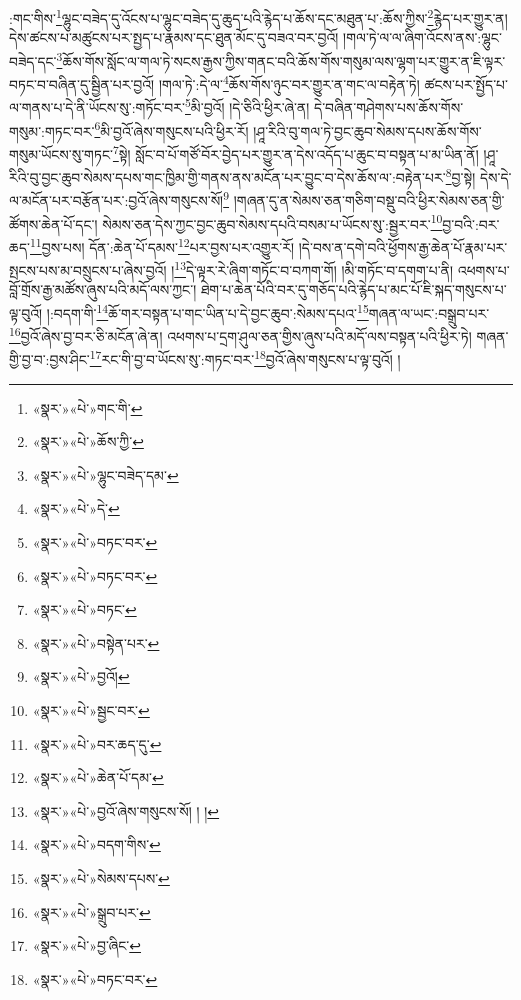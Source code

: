 :གང་གིས་\footnote{«སྣར་»«པེ་»གང་གི་}ལྷུང་བཟེད་དུ་འོངས་པ་ལྷུང་བཟེད་དུ་ཆུད་པའི་རྙེད་པ་ཆོས་དང་མཐུན་པ་:ཆོས་ཀྱིས་\footnote{«སྣར་»«པེ་»ཆོས་ཀྱི་}རྙེད་པར་གྱུར་ན། དེས་ཚངས་པ་མཚུངས་པར་སྤྱད་པ་རྣམས་དང་ཐུན་མོང་དུ་བཟའ་བར་བྱའོ། །གལ་ཏེ་ལ་ལ་ཞིག་འོངས་ནས་:ལྷུང་བཟེད་དང་\footnote{«སྣར་»«པེ་»ལྷུང་བཟེད་དམ་}ཆོས་གོས་སློང་ལ་གལ་ཏེ་སངས་རྒྱས་ཀྱིས་གནང་བའི་ཆོས་གོས་གསུམ་ལས་ལྷག་པར་གྱུར་ན་ཇི་ལྟར་བཏང་བ་བཞིན་དུ་སྦྱིན་པར་བྱའོ། །གལ་ཏེ་:དེ་ལ་\footnote{«སྣར་»«པེ་»དེ་}ཆོས་གོས་ཉུང་བར་གྱུར་ན་གང་ལ་བརྟེན་ཏེ། ཚངས་པར་སྤྱོད་པ་ལ་གནས་པ་དེ་ནི་ཡོངས་སུ་:གཏོང་བར་\footnote{«སྣར་»«པེ་»བཏང་བར་}མི་བྱའོ། །དེ་ཅིའི་ཕྱིར་ཞེ་ན། དེ་བཞིན་གཤེགས་པས་ཆོས་གོས་གསུམ་:གཏང་བར་\footnote{«སྣར་»«པེ་»བཏང་བར་}མི་བྱའོ་ཞེས་གསུངས་པའི་ཕྱིར་རོ། །ཤཱ་རིའི་བུ་གལ་ཏེ་བྱང་ཆུབ་སེམས་དཔས་ཆོས་གོས་གསུམ་ཡོངས་སུ་གཏང་\footnote{«སྣར་»«པེ་»བཏང་}སྟེ། སློང་བ་པོ་གཙོ་བོར་བྱེད་པར་གྱུར་ན་དེས་འདོད་པ་ཆུང་བ་བསྟན་པ་མ་ཡིན་ནོ། །ཤཱ་རིའི་བུ་བྱང་ཆུབ་སེམས་དཔས་གང་ཁྱིམ་གྱི་གནས་ནས་མངོན་པར་བྱུང་བ་དེས་ཆོས་ལ་:བརྟེན་པར་\footnote{«སྣར་»«པེ་»བསྟེན་པར་}བྱ་སྟེ། དེས་དེ་ལ་མངོན་པར་བརྩོན་པར་:བྱའོ་ཞེས་གསུངས་སོ།\footnote{«སྣར་»«པེ་»བྱའོ།} །གཞན་དུ་ན་སེམས་ཅན་གཅིག་བསྡུ་བའི་ཕྱིར་སེམས་ཅན་གྱི་ཚོགས་ཆེན་པོ་དང་། སེམས་ཅན་དེས་ཀྱང་བྱང་ཆུབ་སེམས་དཔའི་བསམ་པ་ཡོངས་སུ་:སྦྱར་བར་\footnote{«སྣར་»«པེ་»སྦྱང་བར་}བྱ་བའི་:བར་ཆད་\footnote{«སྣར་»«པེ་»བར་ཆད་དུ་}བྱས་པས། དོན་:ཆེན་པོ་དམས་\footnote{«སྣར་»«པེ་»ཆེན་པོ་དམ་}པར་བྱས་པར་འགྱུར་རོ། །དེ་བས་ན་དགེ་བའི་ཕྱོགས་རྒྱ་ཆེན་པོ་རྣམ་པར་སྤངས་པས་མ་བསྲུངས་པ་ཞེས་བྱའོ། །\footnote{«སྣར་»«པེ་»བྱའོ་ཞེས་གསུངས་སོ། ། །}དེ་ལྟར་རེ་ཞིག་གཏོང་བ་བཀག་གོ། །མི་གཏོང་བ་དགག་པ་ནི། འཕགས་པ་བློ་གྲོས་རྒྱ་མཚོས་ཞུས་པའི་མདོ་ལས་ཀྱང་། ཐེག་པ་ཆེན་པོའི་བར་དུ་གཅོད་པའི་རྙེད་པ་མང་པོ་ཇི་སྐད་གསུངས་པ་ལྟ་བུའོ། །:བདག་གི་\footnote{«སྣར་»«པེ་»བདག་གིས་}ཆོ་གར་བསྟན་པ་གང་ཡིན་པ་དེ་བྱང་ཆུབ་:སེམས་དཔའ་\footnote{«སྣར་»«པེ་»སེམས་དཔས་}གཞན་ལ་ཡང་:བསྒྲུབ་པར་\footnote{«སྣར་»«པེ་»སྒྲུབ་པར་}བྱའོ་ཞེས་བྱ་བར་ཅི་མངོན་ཞེ་ན། འཕགས་པ་དྲག་ཤུལ་ཅན་གྱིས་ཞུས་པའི་མདོ་ལས་བསྟན་པའི་ཕྱིར་ཏེ། གཞན་གྱི་བྱ་བ་:བྱས་ཤིང་\footnote{«སྣར་»«པེ་»བྱ་ཞིང་}རང་གི་བྱ་བ་ཡོངས་སུ་:གཏང་བར་\footnote{«སྣར་»«པེ་»བཏང་བར་}བྱའོ་ཞེས་གསུངས་པ་ལྟ་བུའོ། །
